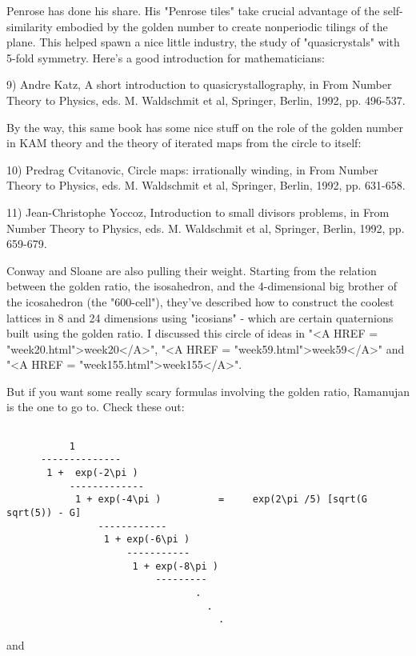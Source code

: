 Penrose has done his share.  His "Penrose tiles" take crucial 
advantage 
of the self-similarity embodied by the golden number to create nonperiodic 
tilings of the plane.  This helped spawn a nice little industry, the study 
of "quasicrystals" with 5-fold symmetry.  Here's a good introduction 
for 
mathematicians:

9) Andre Katz, A short introduction to quasicrystallography, in From 
Number Theory to Physics, eds. M. Waldschmit et al, Springer, Berlin, 
1992, pp. 496-537.

By the way, this same book has some nice stuff on the role of the
golden number in KAM theory and the theory of iterated maps from 
the circle to itself:

10) Predrag Cvitanovic, Circle maps: irrationally winding, in From 
Number Theory to Physics, eds. M. Waldschmit et al, Springer, Berlin, 
1992, pp. 631-658.

11) Jean-Christophe Yoccoz, Introduction to small divisors problems,
in From Number Theory to Physics, eds. M. Waldschmit et al, Springer, 
Berlin, 1992, pp. 659-679.

Conway and Sloane are also pulling their weight.  Starting from the 
relation between the golden ratio, the isosahedron, and the 4-dimensional
big brother of the icosahedron (the "600-cell"), they've described how
to construct the coolest lattices in 8 and 24 dimensions 
using "icosians" - 
which are certain quaternions built using the golden ratio.   I discussed 
this circle of ideas in "<A HREF = "week20.html">week20</A>", 
"<A HREF = "week59.html">week59</A>" and 
"<A HREF = "week155.html">week155</A>".

But if you want some really scary formulas involving the golden ratio, 
Ramanujan is the one to go to.  Check these out:

 

\begin{verbatim}

           1
      --------------
       1 +  exp(-2\pi )
           -------------
            1 + exp(-4\pi )          =     exp(2\pi /5) [sqrt(G sqrt(5)) - G]
                ------------
                 1 + exp(-6\pi )
                     -----------
                      1 + exp(-8\pi )  
                          ---------   
                                 .
                                   .
                                     .
\end{verbatim}
    
and

